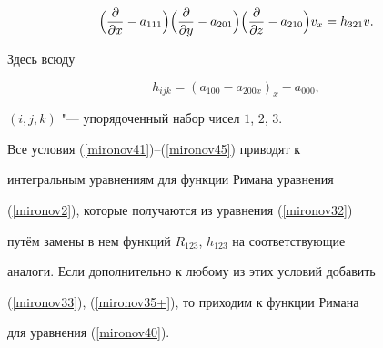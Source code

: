$$


\Bigl ( \frac{\partial}{\partial x}-a_{111} \Bigr )


\Bigl ( \frac{\partial}{\partial y}-a_{201} \Bigr )


\Bigl ( \frac{\partial}{\partial z}-a_{210} \Bigr )


v_{x} = h_{321}v.


$$


Здесь всюду


$$


h_{ijk}=(a_{100}-a_{200x})_{x}-a_{000},


$$


$(i,j,k)$ "--- упорядоченный набор чисел $1$, $2$, $3$.








Все условия (\ref{mironov41})--(\ref{mironov45}) приводят к


интегральным уравнениям для функции Римана уравнения


(\ref{mironov2}), которые получаются из уравнения (\ref{mironov32})


путём замены в нем функций $R_{123}$, $h_{123}$ на соответствующие


аналоги. Если дополнительно к любому из этих условий добавить


(\ref{mironov33}), (\ref{mironov35+}), то приходим к функции Римана


для уравнения (\ref{mironov40}).





